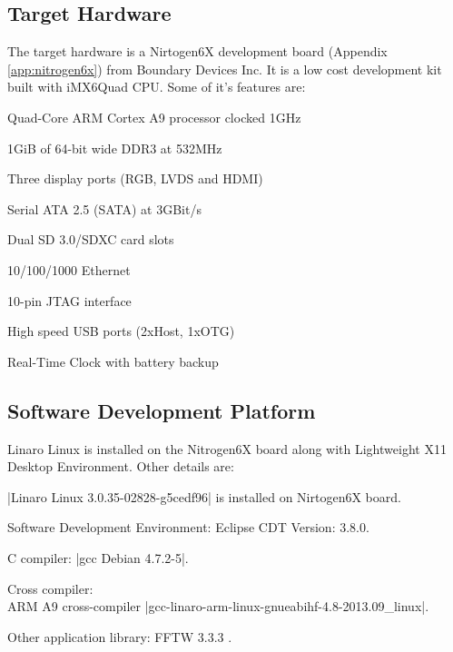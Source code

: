\subsection{Target Hardware}
\label{ss:bg_related_work:hw}
The target hardware is a Nirtogen6X development board (Appendix \ref{app:nitrogen6x}) from Boundary Devices Inc. It is a low cost development kit built with iMX6Quad CPU. Some of it's features are:
\begin{compactitem} 
	\item Quad-Core ARM Cortex A9 processor clocked 1GHz
	\item 1GiB of 64-bit wide DDR3 at 532MHz
	\item Three display ports (RGB, LVDS and HDMI)
	\item Serial ATA 2.5 (SATA) at 3GBit/s
	\item Dual SD 3.0/SDXC card slots
	\item 10/100/1000 Ethernet
	\item 10-pin JTAG interface
	\item High speed USB ports (2xHost, 1xOTG)
	\item Real-Time Clock with battery backup
\end{compactitem}

\subsection{Software Development Platform}
\label{ss:bg_related_work:sw}
Linaro Linux is installed on the Nitrogen6X board along with Lightweight X11 Desktop Environment. Other details are:

\begin{compactitem} 
	\item \bverb|Linaro Linux 3.0.35-02828-g5cedf96| is installed on Nirtogen6X board.
	\item Software Development Environment: Eclipse CDT Version: 3.8.0.
	\item C compiler: \bverb|gcc Debian 4.7.2-5|.
	\item Cross compiler: \\ARM A9 cross-compiler \bverb|gcc-linaro-arm-linux-gnueabihf-4.8-2013.09_linux|.
	\item Other application library: FFTW 3.3.3 \cite{fftw}. \\
\end{compactitem} 

